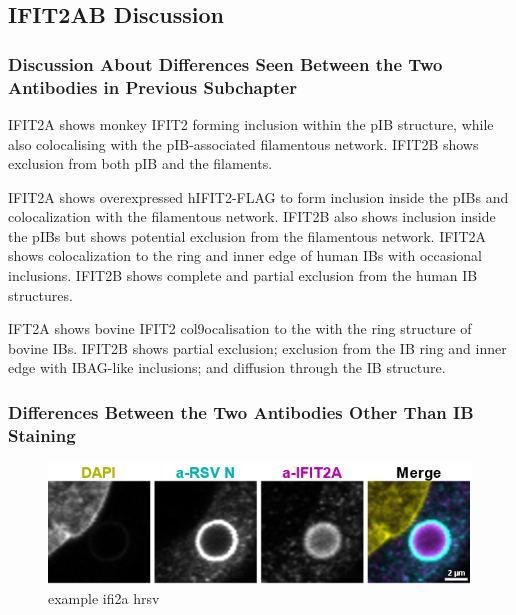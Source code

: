\subsection{IFIT2AB Discussion}\label{subsec:IFIT2AB Discussion}
\subsubsection{Discussion About Differences Seen Between the Two Antibodies in Previous Subchapter} \label{Disuccion sadf}
IFIT2A shows monkey IFIT2 forming inclusion within the pIB structure, while also colocalising with the pIB-associated filamentous network.  IFIT2B shows exclusion from both pIB and the filaments.

IFIT2A shows overexpressed hIFIT2-FLAG to form inclusion inside the pIBs and colocalization with the filamentous network. IFIT2B also shows inclusion inside the pIBs but shows potential exclusion from the filamentous network.
IFIT2A shows colocalization to the ring and inner edge of human IBs with occasional inclusions. IFIT2B shows complete and partial exclusion from the human IB structures. 

IFT2A shows bovine IFIT2 col9ocalisation to the with the ring structure of bovine IBs. IFIT2B shows partial exclusion; exclusion from the IB ring and inner edge with IBAG-like inclusions; and diffusion through the IB structure.
\subsubsection{Differences Between the Two Antibodies Other Than IB Staining} \label{Differences Between the Two Antibodies Other Than IB Staining}
 \label{Human Protein Atlas Show Cytoplasmic Localisation Similar to IFIT2B}

\begin{figure}
    \centering
    \includegraphics[width=1\linewidth]{10. Chapter 5//Figs//01. I2A/04. i2a a549 hrsv n.png}
    \caption[example ifi2a hrsv]{example ifi2a hrsv}
    \label{fig:example ifi2a hrsv}
\end{figure}

